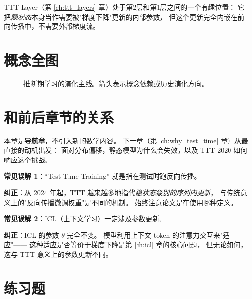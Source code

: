 \begin{remark}
TTT-Layer（第 \ref{ch:ttt_layers} 章）处于第2层和第1层之间的一个有趣位置：
它把\emph{隐状态}本身当作需要被"梯度下降"更新的内部参数，
但这个更新完全内嵌在前向传播中，不需要外部梯度流。
\end{remark}

\section{概念全图}

\begin{figure}[h]
\centering
\caption{推断期学习的演化主线。箭头表示概念依赖或历史演化方向。}
\label{fig:concept_map}
\end{figure}

\section{和前后章节的关系}

本章是\textbf{导航章}，不引入新的数学内容。
下一章（第 \ref{ch:why_test_time} 章）从最直接的动机出发：
面对分布偏移，静态模型为什么会失效，以及 TTT 2020 如何响应这个挑战。

\begin{misconceptionbox}
\textbf{常见误解 1}：``Test-Time Training'' 就是指在测试时跑反向传播。

\textbf{纠正}：从 2024 年起，TTT 越来越多地指代\emph{隐状态级别的序列内更新}，
与传统意义上的"反向传播微调权重"是不同的机制。
始终注意论文是在使用哪种定义。
\end{misconceptionbox}

\begin{misconceptionbox}
\textbf{常见误解 2}：ICL（上下文学习）一定涉及参数更新。

\textbf{纠正}：ICL 的参数 $\theta$ 完全不变。
模型利用上下文 token 的注意力交互来"适应"——
这种适应是否等价于梯度下降是第 \ref{ch:icl} 章的核心问题，
但无论如何，这与 TTT 意义上的参数更新不同。
\end{misconceptionbox}

\section{练习题}

